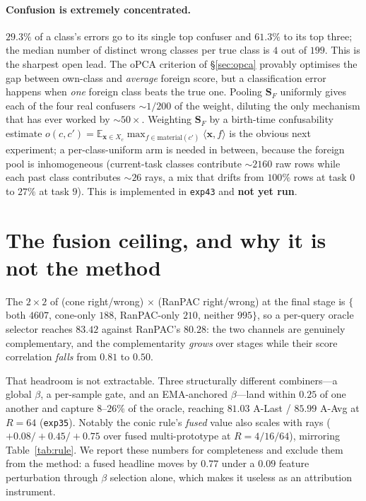 \documentclass[10pt,twocolumn]{article}
\newcommand{\bx}{\mathbf{x}}
\newcommand{\bS}{\mathbf{S}}
\begin{document}
\paragraph{Confusion is extremely concentrated.} $29.3\%$ of a class's errors go
to its single top confuser and $61.3\%$ to its top three; the median number of
distinct wrong classes per true class is $4$ out of $199$. This is the sharpest
open lead. The oPCA criterion of \S\ref{sec:opca} provably optimises the gap
between own-class and \emph{average} foreign score, but a classification error
happens when \emph{one} foreign class beats the true one. Pooling $\bS_F$
uniformly gives each of the four real confusers $\sim1/200$ of the weight,
diluting the only mechanism that has ever worked by $\sim50\times$. Weighting
$\bS_F$ by a birth-time confusability estimate
$o(c,c')=\mathbb{E}_{\bx\in X_c}\max_{f\in\text{material}(c')}\langle\bx,f\rangle$
is the obvious next experiment; a per-class-uniform arm is needed in between,
because the foreign pool is inhomogeneous (current-task classes contribute
$\sim2160$ raw rows while each past class contributes $\sim26$ rays, a mix that
drifts from $100\%$ rows at task $0$ to $27\%$ at task $9$). This is implemented
in \texttt{exp43} and \textbf{not yet run}.

\section{The fusion ceiling, and why it is not the method}
\label{sec:fusion}

The $2\times2$ of (cone right/wrong) $\times$ (RanPAC right/wrong) at the final
stage is $\{$both $4607$, cone-only $188$, RanPAC-only $210$, neither $995\}$,
so a per-query oracle selector reaches $83.42$ against RanPAC's $80.28$: the
two channels are genuinely complementary, and the complementarity \emph{grows}
over stages while their score correlation \emph{falls} from $0.81$ to $0.50$.

That headroom is not extractable. Three structurally different combiners---a
global $\beta$, a per-sample gate, and an EMA-anchored $\beta$---land within
$0.25$ of one another and capture $8$--$26\%$ of the oracle, reaching $81.03$
A-Last / $85.99$ A-Avg at $R{=}64$ (\texttt{exp35}). Notably the conic rule's
\emph{fused} value also scales with rays ($+0.08/+0.45/+0.75$ over fused
multi-prototype at $R{=}4/16/64$), mirroring Table~\ref{tab:rule}. We report
these numbers for completeness and exclude them from the method: a fused
headline moves by $0.77$ under a $0.09$ feature perturbation through $\beta$
selection alone, which makes it useless as an attribution instrument.
\end{document}
